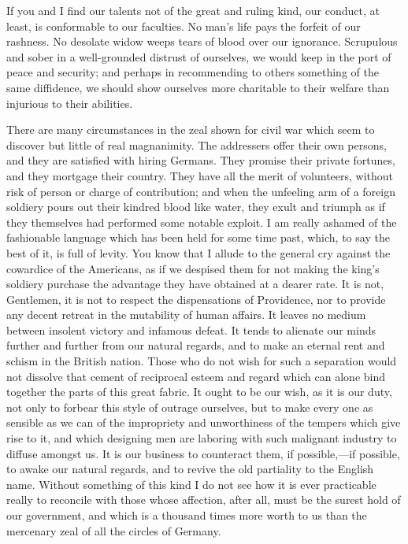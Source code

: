 If you and I find our talents not of the great and ruling kind, our conduct, at least, is conformable to our faculties. No man's life pays the forfeit of our rashness. No desolate widow weeps tears of blood over our ignorance. Scrupulous and sober in a well-grounded distrust of ourselves, we would keep in the port of peace and security; and perhaps in recommending to others something of the same diffidence, we should show ourselves more charitable to their welfare than injurious to their abilities.

There are many circumstances in the zeal shown for civil war which seem to discover but little of real magnanimity. The addressers offer their own persons, and they are satisfied with hiring Germans. They promise their private fortunes, and they mortgage their country. They have all the merit of volunteers, without risk of person or charge of contribution; and when the unfeeling arm of a foreign soldiery pours out their kindred blood like water, they exult and triumph as if they themselves had performed some notable exploit. I am really ashamed of the fashionable language which has been held for some time past, which, to say the best of it, is full of levity. You know that I allude to the general cry against the cowardice of the Americans, as if we despised them for not making the king's soldiery purchase the advantage they have obtained at a dearer rate. It is not, Gentlemen, it is not to respect the dispensations of Providence, nor to provide any decent retreat in the mutability of human affairs. It leaves no medium between insolent victory and infamous defeat. It tends to alienate our minds further and further from our natural regards, and to make an eternal rent and schism in the British nation. Those who do not wish for such a separation would not dissolve that cement of reciprocal esteem and regard which can alone bind together the parts of this great fabric. It ought to be our wish, as it is our duty, not only to forbear this style of outrage ourselves, but to make every one as sensible as we can of the impropriety and unworthiness of the tempers which give rise to it, and which designing men are laboring with such malignant industry to diffuse amongst us. It is our business to counteract them, if possible,—if possible, to awake our natural regards, and to revive the old partiality to the English name. Without something of this kind I do not see how it is ever practicable really to reconcile with those whose affection, after all, must be the surest hold of our government, and which is a thousand times more worth to us than the mercenary zeal of all the circles of Germany.

